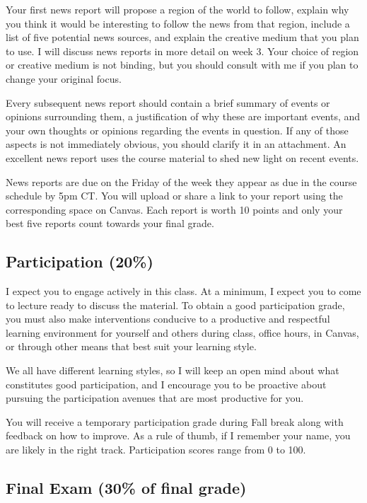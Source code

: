 \documentclass[
  11pt,
]{article}
\begin{document}
Your first news report will propose a region of the world to follow,
explain why you think it would be interesting to follow the news from
that region, include a list of five potential news sources, and explain
the creative medium that you plan to use. I will discuss news reports in
more detail on week 3. Your choice of region or creative medium is not
binding, but you should consult with me if you plan to change your
original focus.

Every subsequent news report should contain a brief summary of events or
opinions surrounding them, a justification of why these are important
events, and your own thoughts or opinions regarding the events in
question. If any of those aspects is not immediately obvious, you should
clarify it in an attachment. An excellent news report uses the course
material to shed new light on recent events.

News reports are due on the Friday of the week they appear as due in the
course schedule by 5pm CT. You will upload or share a link to your
report using the corresponding space on Canvas. Each report is worth 10
points and only your best five reports count towards your final grade.

\hypertarget{participation-20}{%
\subsection{Participation (20\%)}\label{participation-20}}

I expect you to engage actively in this class. At a minimum, I expect
you to come to lecture ready to discuss the material. To obtain a good
participation grade, you must also make interventions conducive to a
productive and respectful learning environment for yourself and others
during class, office hours, in Canvas, or through other means that best
suit your learning style.

We all have different learning styles, so I will keep an open mind about
what constitutes good participation, and I encourage you to be proactive
about pursuing the participation avenues that are most productive for
you.

You will receive a temporary participation grade during Fall break along
with feedback on how to improve. As a rule of thumb, if I remember your
name, you are likely in the right track. Participation scores range from
0 to 100.

\hypertarget{final-exam-30-of-final-grade}{%
\subsection{Final Exam (30\% of final
grade)}\label{final-exam-30-of-final-grade}}
\end{document}
